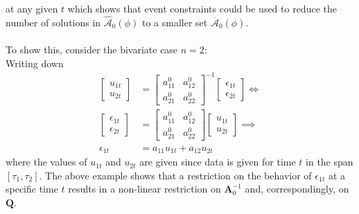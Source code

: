 \documentclass[a4paper,11pt,listof=nochaptergap,oneside,pointednumbers,bibtotoc,bigheadings,liststotoc,hidelinks]{scrbook}
\theoremstyle{mysatz}
\theoremstyle{mydefinition}
\theoremstyle{mytheorem}
\theoremstyle{mybemerkung}
\let\oldhat\hat
\newcommand{\vect}[1]{\boldsymbol{\mathbf{#1}}}
\newcommand{\hatt}[1]{\oldhat{\boldsymbol{\mathbf{#1}}}}
\begin{document}
at any given $t$ which shows that event constraints could be used to reduce the number of solutions in $\hatt{\mathcal{A}}_0(\phi)$ to a smaller set $\overline{\vect{\mathcal{A}}}_0(\phi)$. \\
\\
To show this, \citet{ludvigsonetal:19} consider the bivariate case $n=2$:\\
Writing down
\begin{equation} \label{eq:svar_ludvi11}
\begin{split}
	\begin{bmatrix}
    		u_{1t} \\
		u_{2t}
 		\end{bmatrix} & = 
		\begin{bmatrix}
    			a_{11}^0 &  a_{12}^0 \\
			a_{21}^0 &  a_{22}^0
 			\end{bmatrix}^{-1}
			\begin{bmatrix}
    				\epsilon_{1t} \\
				\epsilon_{2t}
 				\end{bmatrix}  \iff \\
	\begin{bmatrix}
    		\epsilon_{1t} \\
		\epsilon_{2t}
 		\end{bmatrix} & = 
		\begin{bmatrix}
    			a_{11}^0 &  a_{12}^0 \\
			a_{21}^0 &  a_{22}^0
 			\end{bmatrix}
			\begin{bmatrix}
    				u_{1t} \\
				u_{2t}
 				\end{bmatrix} \implies \\
				\epsilon_{1t} & = a_{11}u_{1t} + a_{12}u_{2t}
\end{split}								
\end{equation}
where the values of $u_{1t}$ and $u_{2t}$ are given since data is given for time $t$ in the span $[\tau_1, \tau_2]$. The above example shows that a restriction on the behavior of $\epsilon_{1t}$ at a specific time $t$ results in a non-linear restriction on $\vect{A}_0^{-1}$ and, correspondingly, on $\vect{Q}$.
\\
\\
\end{document}
